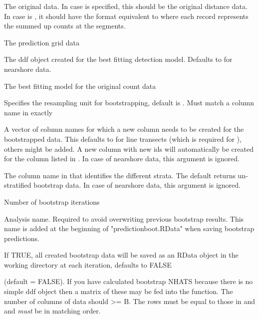 \documentclass[a4paper]{book}
\begin{document}
\begin{Arguments}
\begin{ldescription}
\item[\code{orig.data}] The original data. In case  is specified, this should be the original distance data. In case  is , it should have the format equivalent to  where each record represents the summed up counts at the segments.

\item[\code{predict.data}] The prediction grid data

\item[\code{ddf.obj}] The ddf object created for the best fitting detection model. Defaults to  for nearshore data.

\item[\code{model.obj}] The best fitting  model for the original count data

\item[\code{resample}] Specifies the resampling unit for bootstrapping, default is . Must match a column name in  exactly

\item[\code{rename}] A vector of column names for which a new column needs to be created for the bootstrapped data. This defaults to  for line transects (which is required for ), others might be added. 
A new column with new ids will automatically be created for the column listed in . In case of nearshore data, this argument is ignored.

\item[\code{stratum}] The column name in  that identifies the different strata. The default  returns un-stratified bootstrap data. In case of nearshore data, this argument is ignored.

\item[\code{B}] Number of bootstrap iterations

\item[\code{name}] Analysis name. Required to avoid overwriting previous bootstrap results. This name is added at the beginning of "predictionboot.RData" when saving bootstrap predictions.

\item[\code{save.data}] If TRUE, all created bootstrap data will be saved as an RData object in the working directory at each iteration, defaults to FALSE

\item[\code{nhats}] (default = FALSE). If you have calculated bootstrap NHATS because there is no simple ddf object then a matrix of these may be fed into the function.  The number of columns of data should >= B.  The rows must be equal to those in  and  and \emph{must} be in matching order.
\end{ldescription}
\end{Arguments}
\end{document}
